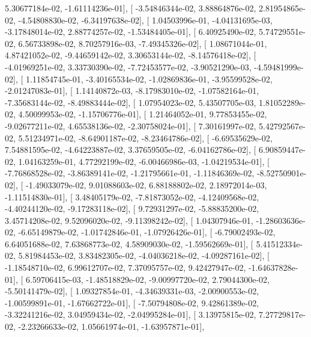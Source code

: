\documentclass{article}
\begin{document}
          5.30677184e-02,  -1.61114236e-01],
       [ -3.54846344e-02,   3.88864876e-02,   2.81954865e-02,
         -4.54808830e-02,  -6.34197638e-02],
       [  1.04503996e-01,  -4.04131695e-03,  -3.17848014e-02,
          2.88774257e-02,  -1.53484405e-01],
       [  6.40925490e-02,   5.74729551e-02,   6.56733898e-02,
          8.70257916e-03,  -7.49345326e-02],
       [  1.08671044e-01,   4.87421052e-02,  -9.44659142e-02,
          3.30653144e-02,  -8.14576418e-02],
       [ -4.01969251e-02,   3.33730390e-02,  -7.72453577e-02,
         -3.90521290e-03,  -4.59481999e-02],
       [  1.11854745e-01,  -3.40165534e-02,  -1.02869836e-01,
         -3.95599528e-02,  -2.01247083e-01],
       [  1.14140872e-03,  -8.17983010e-02,  -1.07582164e-01,
         -7.35683144e-02,  -8.49883444e-02],
       [  1.07954023e-02,   5.43507705e-03,   1.81052289e-02,
          4.50099953e-02,  -1.15706776e-01],
       [  1.21464052e-01,   9.77853455e-02,  -9.02677211e-02,
          4.65538136e-02,  -2.30758024e-01],
       [  7.30161997e-02,   5.42792567e-02,   5.51234971e-02,
         -8.64901187e-02,  -8.23464786e-02],
       [ -6.69535629e-02,   7.54881595e-02,  -4.64223887e-02,
          3.37659505e-02,  -6.04162786e-02],
       [  6.90859447e-02,   1.04163259e-01,   4.77292199e-02,
         -6.00466986e-03,  -1.04219534e-01],
       [ -7.76868528e-02,  -3.86389141e-02,  -1.21795661e-01,
         -1.11846369e-02,  -8.52750901e-02],
       [ -1.49033079e-02,   9.01088603e-02,   6.88188802e-02,
          2.18972014e-03,  -1.11514830e-01],
       [  3.48405179e-02,  -7.81873052e-02,  -4.12409568e-02,
         -4.40244120e-02,  -9.17283118e-02],
       [  9.72931297e-02,  -5.88835200e-02,   3.45714208e-02,
          9.52096020e-02,  -9.11398242e-02],
       [  1.04307946e-01,  -1.28603636e-02,  -6.65149879e-02,
         -1.01742846e-01,  -1.07926426e-01],
       [ -6.79002493e-02,   6.64051688e-02,   7.63868773e-02,
          4.58909030e-02,  -1.59562669e-01],
       [  5.41512334e-02,   5.81984453e-02,   3.83482305e-02,
         -4.04036218e-02,  -4.09287161e-02],
       [ -1.18548710e-02,   6.99612707e-02,   7.37095757e-02,
          9.42427947e-02,  -1.64637828e-01],
       [  6.59706415e-03,  -1.48518829e-02,  -9.00997720e-02,
          2.79044300e-02,  -5.50141479e-02],
       [  1.09327854e-01,  -4.34639331e-03,  -2.00900553e-02,
         -1.00599891e-01,  -1.67662722e-01],
       [ -7.50794808e-02,   9.42861389e-02,  -3.32241216e-02,
          3.04959434e-02,  -2.04995284e-01],
       [  3.13975815e-02,   7.27729817e-02,  -2.23266633e-02,
          1.05661974e-01,  -1.63957871e-01],
\end{document}
